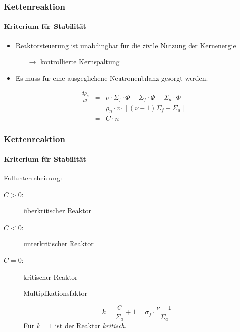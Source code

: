 \documentclass{beamer}[9pt]
\begin{document}
\begin{frame}
\frametitle{Kettenreaktion}
\framesubtitle{Kriterium für Stabilität}

\begin{itemize}
\item Reaktorsteuerung ist unabdingbar für die zivile Nutzung der Kernenergie
\begin{itemize}
\item[$\rightarrow$] kontrollierte Kernspaltung
\end{itemize}
\item Es muss für eine ausgeglichene Neutronenbilanz gesorgt werden.

\begin{eqnarray*}
\frac{d \rho_n}{dt}& =& \nu\cdot \Sigma_f \cdot \Phi - \Sigma_f \cdot \Phi  - \Sigma_a\cdot\Phi\\& = & \rho_n\cdot v \cdot \left[\left(\nu - 1 \right)\Sigma_f - \Sigma_a
 \right]\\&=& C\cdot n
\end{eqnarray*}
\end{itemize}
\end{frame}


\begin{frame}
\frametitle{Kettenreaktion}
\framesubtitle{Kriterium für Stabilität}

Fallunterscheidung:
\begin{description}
\item[$C > 0$:] überkritischer Reaktor
\item[$C < 0$:] unterkritischer Reaktor
\item[$C = 0$:] kritischer Reaktor
\begin{block}{Multiplikationsfaktor }

\[
 k = \frac{C}{\Sigma_a}+1 =  \sigma_f\cdot\frac{\nu-1}{\Sigma_a}
\]
Für $k=1$ ist der Reaktor \textit{kritisch}.
\end{block} 
\end{description}
\end{frame}
\end{document}

